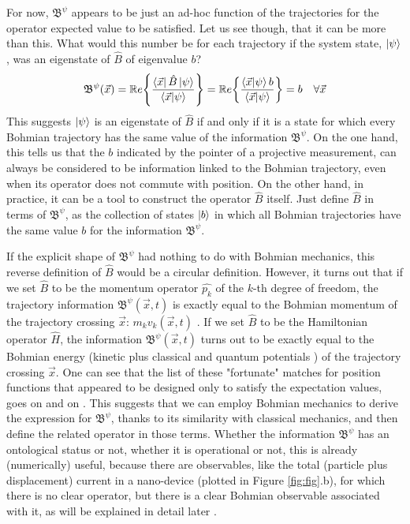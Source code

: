 \documentclass[11pt, a4paper]{article} %
\newcommand{\B}{\mathfrak{B}}
\begin{document}
For now, $\B^\psi$ appears to be just an ad-hoc function of the trajectories for the operator expected value to be satisfied. Let us see though, that it can be more than this. What would this number be for each trajectory if the system state, $\ket{\psi}$, was an eigenstate of $\hat{B}$ of eigenvalue $b$?\vspace{-0.1cm}
\begin{equation}
\B^\psi(\vec{x})=\mathbb{R}e\qty{ \frac{\bra{\vec{x}}\hat{B}\ket{\psi}}{\bra{\vec{x}}\ket{\psi}} } = \mathbb{R}e\qty{ \frac{\bra{\vec{x}}\ket{\psi}b}{\bra{\vec{x}}\ket{\psi}} }=b\quad \forall \vec{x}\vspace{-0.1cm}
\end{equation}
This suggests $\ket{\psi}$ is an eigenstate of $\hat{B}$ if and only if it is a state for which every Bohmian trajectory has the same value of the information $\B^\psi$. On the one hand, this tells us that the $b$ indicated by the pointer of a projective measurement, can always be considered to be information linked to the Bohmian trajectory, even when its operator does not commute with position. On the other hand, in practice, it can be a tool to construct the operator $\hat{B}$ itself. Just define $\hat{B}$ in terms of $\B^\psi$, as the collection of states $\ket{b}$ in which all Bohmian trajectories have the same value $b$ for the information $\B^\psi$.

If the explicit shape of $\B^\psi$ had nothing to do with Bohmian mechanics, this reverse definition of $\hat{B}$ would be a circular definition. However, it turns out that if we set $\hat{B}$ to be the momentum operator $\hat{p_k}$ of the $k$-th degree of freedom, the trajectory information $\B^\psi(\vec{x},t)$ is exactly equal to the Bohmian momentum of the trajectory crossing $\vec{x}$: $m_k v_k(\vec{x},t)$ \cite{DevInPosition1}. If we set $\hat{B}$ to be the Hamiltonian operator $\hat{H}$, the information $\B^\psi(\vec{x},t)$ turns out to be exactly equal to the Bohmian energy (kinetic plus classical and quantum potentials \cite{JordiXavier}) of the trajectory crossing $\vec{x}$. One can see that the list of these "fortunate" matches for position functions that appeared to be designed only to satisfy the expectation values, goes on and on \cite{Holland}. This suggests that we can employ Bohmian mechanics to derive the expression for $\B^\psi$, thanks to its similarity with classical mechanics, and then define the related operator in those terms. Whether the information $\B^\psi$ has an ontological status or not, whether it is operational or not, this is already (numerically) useful, because there are observables, like the total (particle plus  displacement) current in a nano-device (plotted in Figure \ref{fig:fig}.b), for which there is no clear operator, but there is a clear Bohmian observable associated with it, as will be explained in detail later \cite{Pel, equiv}.
\end{document}
